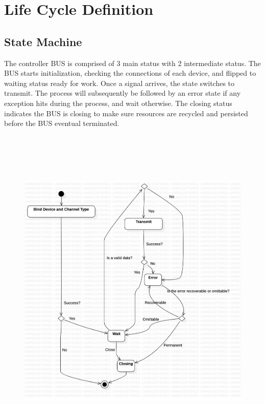\documentclass[12pt,article]{memoir}
\begin{document}
\newpage
\chapter{Life Cycle Definition}
\section{State Machine}
The controller BUS is comprised of 3 main status with 2 intermediate status. The BUS starts initialization, checking the connections of each device, and flipped to waiting status ready for work. Once a signal arrives, the state switches to transmit. The process will subsequently be followed by an error state if any exception hits during the process, and wait otherwise. The closing status indicates the BUS is closing to make sure resources are recycled and persisted before the BUS eventual terminated. 

\begin{figure}[h]
\includegraphics[width=16cm,height=16cm]{img/DR00012_BUS_statemachine.png}
\end{figure}
\newpage
\end{document}

